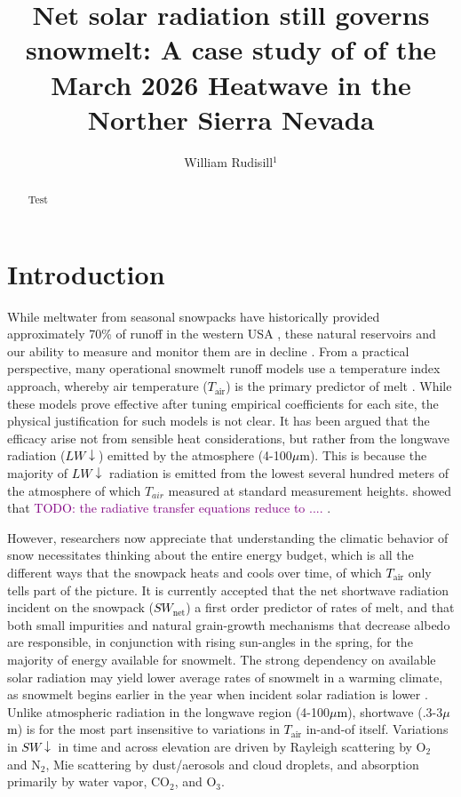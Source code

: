 \documentclass[12pt]{iopjournal}
\newcommand{\comment}[1]{\textcolor{purple}{TODO: #1}}      %
\newcommand{\tair}{\textcolor{black}{$T_{\mathrm{air}}$}\xspace}
\newcommand{\lwdn}{\textcolor{black}{$LW\downarrow$}\xspace}
\newcommand{\swnet}{\textcolor{black}{$SW_{\mathrm{net}}$}\xspace}
\newcommand{\swdn}{\textcolor{black}{$SW\downarrow$}\xspace}
\newcommand{\um}{\textcolor{black}{$\mu$m}\xspace}
\begin{document}
\title{Net solar radiation still governs snowmelt: A case study of of the March 2026 Heatwave in the Norther Sierra Nevada}

\author{William Rudisill$^1$}



\begin{abstract}
Test 
\end{abstract}

\section{Introduction}
While meltwater from seasonal snowpacks have historically provided approximately 70\% of runoff in the western USA \citep{Li2017-dj}, these natural reservoirs and our ability to measure and monitor them are in decline \citep{Hale2023-kx, Cowherd2024-zm}.
From a practical perspective, many operational snowmelt runoff models use a temperature index approach, whereby air temperature (\tair) is the primary predictor of melt \cite{Anderson1973-jx}.
While these models prove effective after tuning empirical coefficients for each site, the physical justification for such models is not clear.
It has been argued that the efficacy arise not from sensible heat considerations, but rather from the longwave radiation (\lwdn) emitted by the atmosphere (4-100\um). 
This is because the majority of \lwdn radiation is emitted from the lowest several hundred meters of the atmosphere \citep{Pluss1997-wx, Ohmura2001-ll} of which $T_{air}$ measured at standard measurement heights.
\cite{Brutsaert1975-jl} showed that \comment{the radiative transfer equations reduce to .... }.

However, researchers now appreciate that understanding the climatic behavior of snow necessitates thinking about the entire energy budget, which is all the different ways that the snowpack heats and cools over time, of which \tair only tells part of the picture.
It is currently accepted that the net shortwave radiation incident on the snowpack (\swnet) a first order predictor of rates of melt, and that both small impurities \citep{Deems2013-vv} and natural grain-growth mechanisms that decrease albedo are responsible, in conjunction with rising sun-angles in the spring, for the majority of energy available for snowmelt.
The strong dependency on available solar radiation may yield lower average rates of snowmelt in a warming climate, as snowmelt begins earlier in the year when incident solar radiation is lower \citep{Musselman2017-av}.
Unlike atmospheric radiation in the longwave region (4-100\um), shortwave (.3-3\um) is for the most part insensitive to variations in \tair in-and-of itself. 
Variations in \swdn in time and across elevation are driven by Rayleigh scattering by O$_2$ and N$_2$, Mie scattering by dust/aerosols and cloud droplets, and absorption primarily by water vapor, CO$_2$, and O$_3$.
\end{document}
